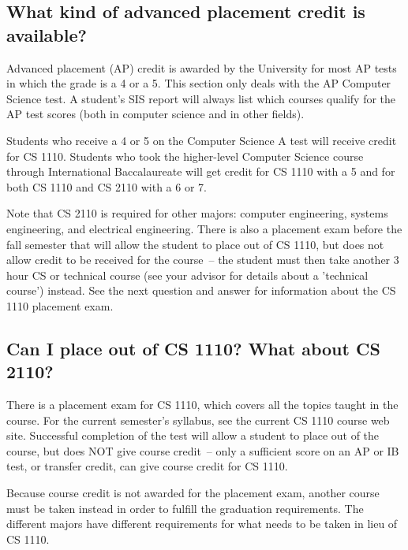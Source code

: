 \subsection{What kind of advanced placement credit is available?}
\label{applacement}

Advanced placement (AP) credit is awarded by the University for most
AP tests in which the grade is a 4 or a 5. This section only deals
with the AP Computer Science test. A student's SIS report will
always list which courses qualify for the AP test scores (both in
computer science and in other fields).

Students who receive a 4 or 5 on the Computer Science A test will
receive credit for CS 1110.  Students who took the higher-level Computer
Science course through International Baccalaureate will get credit for
CS 1110 with a 5 and for both CS 1110 and CS 2110 with a 6 or 7.

Note that CS 2110 is required for other majors: computer engineering,
systems engineering, and electrical engineering. There is also a
placement exam before the fall semester that will allow the student to
place out of CS 1110, but does not allow credit to be received for the
course~-- the student must then take another 3 hour CS or technical
course (see your advisor for details about a 'technical course')
instead. See the next question and answer for information about the CS
1110 placement exam.

\subsection{Can I place out of CS 1110? What about CS 2110?}
\label{101placement}

There is a placement exam for CS 1110, which covers all the topics
taught in the course. For the current semester's syllabus, see the
current CS 1110 course web site. Successful completion of the test
will allow a student to place out of the course, but does NOT give
course credit~-- only a sufficient score on an AP or IB test, or
transfer credit, can give course credit for CS 1110.

Because course credit is not awarded for the placement exam, another
course must be taken instead in order to fulfill the graduation
requirements.  The different majors have different requirements for
what needs to be taken in lieu of CS 1110.

